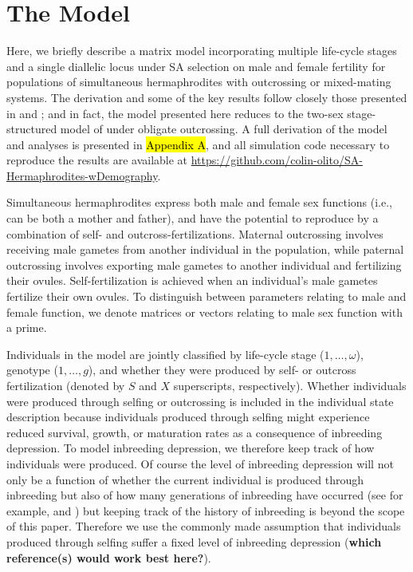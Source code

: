 \documentclass[11pt]{article}
\begin{document}
\section{The Model}

Here, we briefly describe a matrix model incorporating multiple life-cycle stages and a single diallelic locus under SA selection on male and female fertility for populations of simultaneous hermaphrodites with outcrossing or mixed-mating systems. The derivation and some of the key results follow closely those presented in \citet{deVriesCaswell2019a} and \citet{deVriesCaswell2019b}; and in fact, the model presented here reduces to the two-sex stage-structured model of \citet{deVriesCaswell2019b} under obligate outcrossing. A full derivation of the model and analyses is presented in \hl{Appendix A}, and all simulation code necessary to reproduce the results are available at \url{https://github.com/colin-olito/SA-Hermaphrodites-wDemography}.

Simultaneous hermaphrodites express both male and female sex functions (i.e., can be both a mother and father), and have the potential to reproduce by a combination of self- and outcross-fertilizations. Maternal outcrossing involves receiving male gametes from another individual in the population, while paternal outcrossing involves exporting male gametes to another individual and fertilizing their ovules. Self-fertilization is achieved when an individual's male gametes fertilize their own ovules. To distinguish between parameters relating to male and female function, we denote matrices or vectors relating to male sex function with a prime. 

Individuals in the model are jointly classified by life-cycle stage ($1, \ldots, \omega$), genotype ($1, \ldots, g$), and whether they were produced by self- or outcross fertilization (denoted by $S$ and $X$ superscripts, respectively). Whether individuals were produced through selfing or outcrossing is included in the individual state description because individuals produced through selfing might experience reduced survival, growth, or maturation rates as a consequence of inbreeding depression. To model inbreeding depression, we therefore keep track of how individuals were produced. Of course the level of inbreeding depression will not only be a function of whether the current individual is produced through inbreeding but also of how many generations of inbreeding have occurred (see for example, \cite{kelly1999response} and \cite{kelly2007mutation}) but keeping track of the history of inbreeding is beyond the scope of this paper. Therefore we use the commonly made assumption that individuals produced through selfing suffer a fixed level of inbreeding depression (\textbf{which reference(s) would work best here?}).
\end{document}
